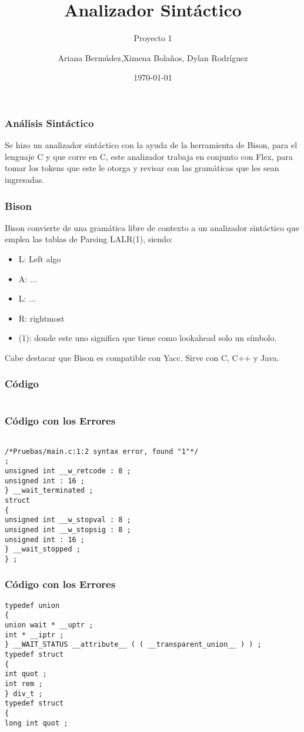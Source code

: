 \documentclass{beamer}
\title{Analizador Sint\'actico}
\subtitle{Proyecto 1}
\author{Ariana Berm\'udez,Ximena Bola\~nos, Dylan Rodr\'iguez}
\institute{Instituto Tecnol\'ogico de Costa Rica}
\date{\today}
\begin{document}
\begin{frame}
 \titlepage 
 \end{frame}\begin{frame}
 \frametitle{An\'alisis Sint\'actico}
  Se hizo un analizador sint\'actico con la ayuda de la herramienta de Bison, para el lenguaje C y que corre en C, este analizador trabaja en conjunto con Flex, para tomar los tokens que este le otorga y revisar con las gram\'aticas que les sean ingresadas. \end{frame}\begin{frame}
 \frametitle{Bison}
 Bison convierte de una gram\'atica libre de contexto a un analizador sint\'actico que emplea las tablas de Parsing LALR(1), siendo: \begin{itemize} \item L: Left algo \item A: ... \item L: ... \item R: rightmost \item (1): donde este uno significa que tiene como lookahead solo un s\'imbolo. \end{itemize} Cabe destacar que Bison es compatible con Yacc. Sirve con C, C++ y Java. \end{frame}\begin{frame}[fragile]
\frametitle{C\'odigo}
\begin{lstlisting}[style=CStyle]
\end{lstlisting}
\end{frame}
\begin{frame}[fragile]
\frametitle{C\'odigo con los Errores}
\begin{lstlisting}[style=CStyle]

/*Pruebas/main.c:1:2 syntax error, found "1"*/
; 
unsigned int __w_retcode : 8 ; 
unsigned int : 16 ; 
} __wait_terminated ; 
struct 
{ 
unsigned int __w_stopval : 8 ; 
unsigned int __w_stopsig : 8 ; 
unsigned int : 16 ; 
} __wait_stopped ; 
} ; 
\end{lstlisting}
\end{frame}
\begin{frame}[fragile]
\frametitle{C\'odigo con los Errores}
\begin{lstlisting}[style=CStyle]
typedef union 
{ 
union wait * __uptr ; 
int * __iptr ; 
} __WAIT_STATUS __attribute__ ( ( __transparent_union__ ) ) ; 
typedef struct 
{ 
int quot ; 
int rem ; 
} div_t ; 
typedef struct 
{ 
long int quot ; 
\end{lstlisting}
\end{frame}
\end{document}
